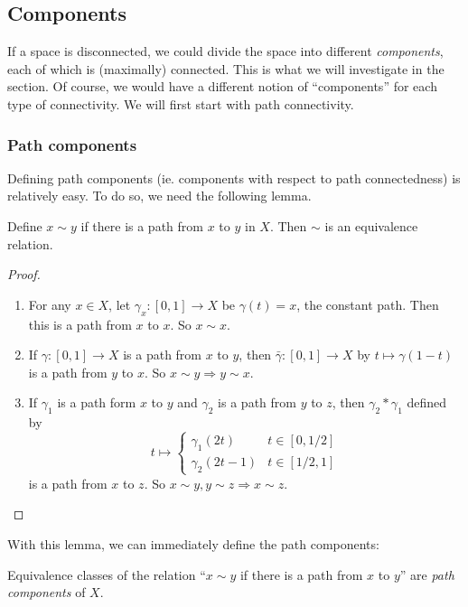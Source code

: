 \documentclass[a4paper]{article}
\begin{document}
\subsection{Components}
If a space is disconnected, we could divide the space into different \emph{components}, each of which is (maximally) connected. This is what we will investigate in the section. Of course, we would have a different notion of ``components'' for each type of connectivity. We will first start with path connectivity.

\subsubsection{Path components}
Defining path components (ie. components with respect to path connectedness) is relatively easy. To do so, we need the following lemma.

\begin{lemma}
  Define $x\sim y$ if there is a path from $x$ to $y$ in $X$. Then $\sim$ is an equivalence relation.
\end{lemma}

\begin{proof}\leavevmode
  \begin{enumerate}
    \item For any $x\in X$, let $\gamma_x: [0, 1] \to X$ be $\gamma(t) = x$, the constant path. Then this is a path from $x$ to $x$. So $x\sim x$.
    \item If $\gamma: [0, 1] \to X$ is a path from $x$ to $y$, then $\bar \gamma: [0, 1] \to X$ by $t \mapsto \gamma(1 - t)$ is a path from $y$ to $x$. So $x\sim y \Rightarrow y\sim x$.
    \item If $\gamma_1$ is a path form $x$ to $y$ and $\gamma_2$ is a path from $y$ to $z$, then $\gamma_2*\gamma_1$ defined by 
      \[
        t\mapsto
        \begin{cases}
          \gamma_1(2t) & t\in [0, 1/2]\\
          \gamma_2(2t - 1) & t\in [1/2, 1]
        \end{cases}
      \]
      is a path from $x$ to $z$. So $x\sim y, y\sim z \Rightarrow x\sim z$.
  \end{enumerate}
\end{proof}

With this lemma, we can immediately define the path components:
\begin{defi}
  Equivalence classes of the relation ``$x\sim y$ if there is a path from $x$ to $y$'' are \emph{path components} of $X$.
\end{defi}
\end{document}
